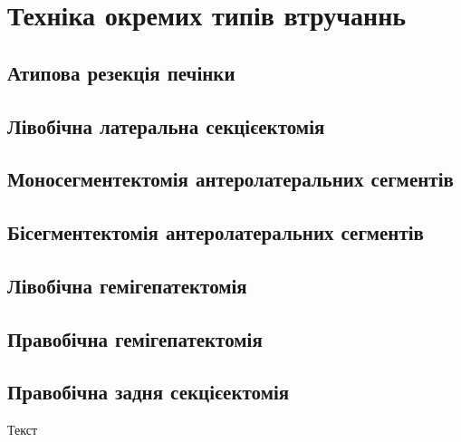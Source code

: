 \chapter{Техніка окремих типів втручаннь}
\begin{refsection}
\section{Атипова резекція печінки}

\section{Лівобічна латеральна секцієектомія}

\section{Моносегментектомія антеролатеральних сегментів}

\section{Бісегментектомія антеролатеральних сегментів}

\section{Лівобічна гемігепатектомія}

\section{Правобічна гемігепатектомія}

\section{Правобічна задня секцієектомія}

Текст
\printbibliography [heading=subbibliography]
\end{refsection}